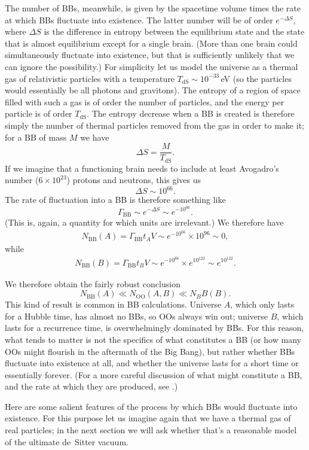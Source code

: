\documentclass[12pt,letterpaper]{article}
\newcommand{\be}{\begin{equation}}
\newcommand{\ee}{\end{equation}}
\newcommand{\dS}{{\mathrm{dS}}}
\newcommand{\OO}{{\mathrm{OO}}}
\newcommand{\BB}{{\mathrm{BB}}}
\begin{document}
The number of BBs, meanwhile, is given by the spacetime volume times the rate at which BBs fluctuate into existence.
The latter number will be of order $e^{-\Delta S}$, where $\Delta S$ is the difference in entropy between the equilibrium state and the state that is almost equilibrium except for a single brain.
(More than one brain could simultaneously fluctuate into existence, but that is sufficiently unlikely that we can ignore the possibility.)
For simplicity let us model the universe as a thermal gas of relativistic particles with a temperature $T_\dS \sim 10^{-33}$\,eV (so the particles would essentially be all photons and gravitons).
The entropy of a region of space filled with such a gas is of order the number of particles, and the energy per particle is of order $T_\dS$.
The entropy decrease when a BB is created is therefore simply the number of thermal particles removed from the gas in order to make it; for a BB of mass $M$ we have
\be
  \Delta S = \frac{M}{T_\dS}. 
\ee
If we imagine that a functioning brain needs to include at least Avogadro's number ($6\times 10^{23}$) protons and neutrons, this gives us
\be
  \Delta S \sim 10^{66}.
\ee
The rate of fluctuation into a BB is therefore something like
\be
  \Gamma_\BB \sim e^{-\Delta S} \sim e^{-10^{66}}.
\ee
(This is, again, a quantity for which units are irrelevant.)
We therefore have
\begin{align}
  N_\BB(A) = \Gamma_\BB t_A V \sim e^{-10^{66}} \times 10^{96} \sim 0 ,
  \label{nbba}
\end{align}
while
\begin{align}
  N_\BB(B) = \Gamma_\BB t_B V \sim e^{-10^{66}} \times e^{10^{122}} \sim e^{10^{122}}. 
  \label{nbbb}
\end{align}

We therefore obtain the fairly robust conclusion
\be
  N_\BB(A) \ll N_\OO(A,B) \ll N_BB(B).
\ee
This kind of result is common in BB calculations.
Universe $A$, which only lasts for a Hubble time, has almost no BBs, so OOs always win out; universe $B$, which lasts for a recurrence time, is overwhelmingly dominated by BBs.
For this reason, what tends to matter is not the specifics of what constitutes a BB (or how many OOs might flourish in the aftermath of the Big Bang), but rather whether BBs fluctuate into existence at all, and whether the universe lasts for a short time or essentially forever.
(For a more careful discussion of what might constitute a BB, and the rate at which they are produced, see \cite{DeSimone:2008if}.)

Here are some salient features of the process by which BBs would fluctuate into existence.
For this purpose let us imagine again that we have a thermal gas of real particles; in the next section we will ask whether that's a reasonable model of the ultimate de~Sitter vacuum.
\end{document}
